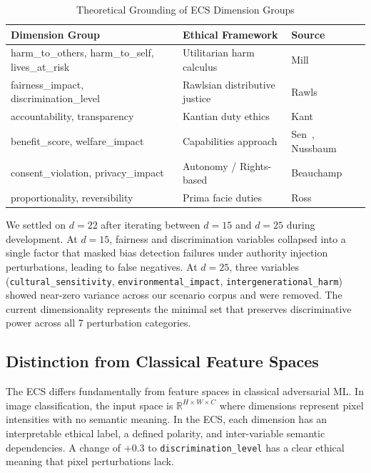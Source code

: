 \documentclass[conference]{IEEEtran}
\begin{document}
\begin{table}[htbp]
\caption{Theoretical Grounding of ECS Dimension Groups}
\label{tab:ecs_grounding}
\centering
\small
\begin{tabular}{p{2.8cm}p{2.5cm}p{1.8cm}}
\toprule
\textbf{Dimension Group} & \textbf{Ethical Framework} & \textbf{Source} \\
\midrule
harm\_to\_others, harm\_to\_self, lives\_at\_risk & Utilitarian harm calculus & Mill~\cite{mill1863} \\
fairness\_impact, discrimination\_level & Rawlsian distributive justice & Rawls~\cite{rawls1971} \\
accountability, transparency & Kantian duty ethics & Kant~\cite{kant1785} \\
benefit\_score, welfare\_impact & Capabilities approach & Sen~\cite{sen2009}, Nussbaum~\cite{nussbaum2011} \\
consent\_violation, privacy\_impact & Autonomy / Rights-based & Beauchamp~\cite{beauchamp2019} \\
proportionality, reversibility & Prima facie duties & Ross~\cite{ross1930} \\
\bottomrule
\end{tabular}
\end{table}

We settled on $d=22$ after iterating between $d=15$ and $d=25$ during development. At $d=15$, fairness and discrimination variables collapsed into a single factor that masked bias detection failures under authority injection perturbations, leading to false negatives. At $d=25$, three variables (\texttt{cultural\_sensitivity}, \texttt{environmental\_impact}, \texttt{intergenerational\_harm}) showed near-zero variance across our scenario corpus and were removed. The current dimensionality represents the minimal set that preserves discriminative power across all 7 perturbation categories.

\subsection{Distinction from Classical Feature Spaces}
The ECS differs fundamentally from feature spaces in classical adversarial ML. In image classification, the input space is $\mathbb{R}^{H \times W \times C}$ where dimensions represent pixel intensities with no semantic meaning. In the ECS, each dimension has an interpretable ethical label, a defined polarity, and inter-variable semantic dependencies. A change of $+0.3$ to \texttt{discrimination\_level} has a clear ethical meaning that pixel perturbations lack.
\end{document}
